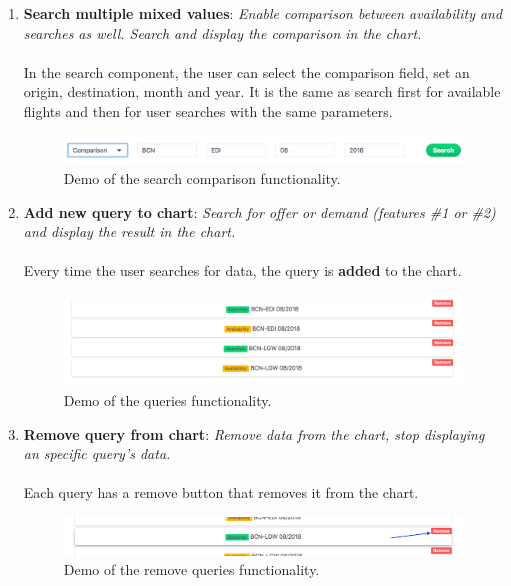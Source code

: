 \begin{enumerate}
    \item \textbf{Search multiple mixed values}: \textit{Enable comparison between availability and searches as well. Search and display the comparison in the chart.}
    \\\\
    In the search component, the user can select the comparison field, set an origin, destination, month and year. It is the same as search first for available flights and then for user searches with the same parameters.
    \begin{figure}[H]
    \centering
    \includegraphics[scale=0.35]{resources/search-comparison.png}
    \caption{Demo of the search comparison functionality.}
    \end{figure}

    \item \textbf{Add new query to chart}: \textit{Search for offer or demand (features \#1 or \#2) and display the result in the chart.}
    \\\\
    Every time the user searches for data, the query is \textbf{added} to the chart.
    \begin{figure}[H]
    \centering
    \includegraphics[scale=0.35]{resources/queries-list.png}
    \caption{Demo of the queries functionality.}
    \end{figure}

    \item \textbf{Remove query from chart}: \textit{Remove data from the chart, stop displaying an specific query's data.}
    \\\\
    Each query has a remove button that removes it from the chart.
    \begin{figure}[H]
    \centering
    \includegraphics[scale=0.35]{resources/queries-remove.png}
    \caption{Demo of the remove queries functionality.}
    \end{figure}


\end{enumerate}
